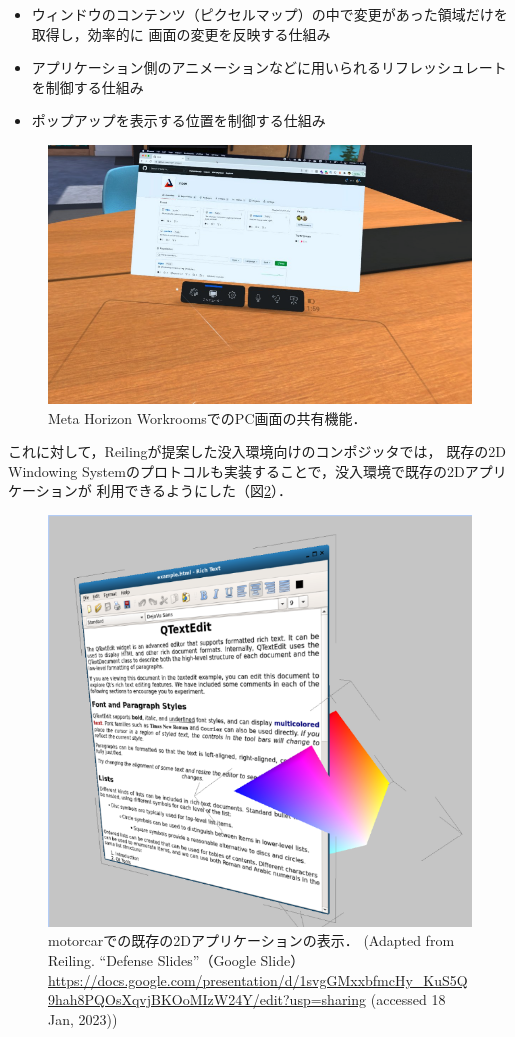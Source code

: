 \begin{itemize}
  \item ウィンドウのコンテンツ（ピクセルマップ）の中で変更があった領域だけを取得し，効率的に
        画面の変更を反映する仕組み
  \item アプリケーション側のアニメーションなどに用いられるリフレッシュレートを制御する仕組み
  \item ポップアップを表示する位置を制御する仕組み
\end{itemize}

\begin{figure}[htbp]
  \centering
  \includegraphics[keepaspectratio, width=0.7\linewidth]{figures/share-2d-window.png}
  \caption{
    Meta Horizon WorkroomsでのPC画面の共有機能．
  }
  \label{fig:share-2d-window}
\end{figure}

これに対して，Reiling\cite{reiling}が提案した没入環境向けのコンポジッタでは，
既存の2D Windowing Systemのプロトコルも実装することで，没入環境で既存の2Dアプリケーションが
利用できるようにした（図\ref{fig:reiling-2d}）．

\begin{figure}[htbp]
  \centering
  \includegraphics[keepaspectratio, width=0.7\linewidth]{figures/reiling-2d.png}
  \caption{
    motorcar\cite{reiling}での既存の2Dアプリケーションの表示．
    (Adapted from Reiling. ``Defense Slides''（Google Slide） \url{https://docs.google.com/presentation/d/1svgGMxxbfmcHy_KuS5Q9hah8PQOsXqvjBKOoMIzW24Y/edit?usp=sharing} (accessed 18 Jan, 2023))
  }
  \label{fig:reiling-2d}
\end{figure}

